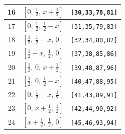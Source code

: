 \documentclass[fleqn,8pt]{jsarticle}
\begin{document}
\begin{longtable}{ccc}
16 & $\left[ 0,\, \frac{1}{2},\, x + \frac{1}{2} \right]$ & {\tt [30,33,78,81]} \\ \hline
17 & $\left[ 0,\, \frac{1}{2},\, \frac{1}{2} - x \right]$ & {\tt [31,35,79,83]} \\ \hline
18 & $\left[ \frac{1}{2},\, \frac{1}{2} - x,\, 0 \right]$ & {\tt [32,34,80,82]} \\ \hline
19 & $\left[ \frac{1}{2} - x,\, \frac{1}{2},\, 0 \right]$ & {\tt [37,38,85,86]} \\ \hline
20 & $\left[ \frac{1}{2},\, 0,\, x + \frac{1}{2} \right]$ & {\tt [39,48,87,96]} \\ \hline
21 & $\left[ \frac{1}{2},\, 0,\, \frac{1}{2} - x \right]$ & {\tt [40,47,88,95]} \\ \hline
22 & $\left[ 0,\, \frac{1}{2} - x,\, \frac{1}{2} \right]$ & {\tt [41,43,89,91]} \\ \hline
23 & $\left[ 0,\, x + \frac{1}{2},\, \frac{1}{2} \right]$ & {\tt [42,44,90,92]} \\ \hline
24 & $\left[ x + \frac{1}{2},\, \frac{1}{2},\, 0 \right]$ & {\tt [45,46,93,94]} \\
\end{longtable}
\renewcommand{\arraystretch}{1.2}
\end{document}
